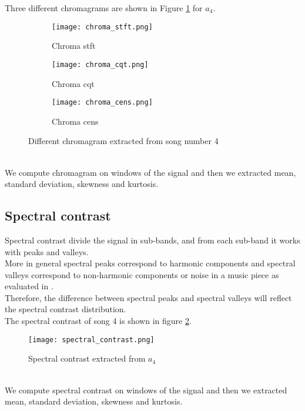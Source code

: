 Three different chromagrams are shown in Figure \ref{fig:chroma} for $a_4$.
\begin{figure}[h]
    \centering
    \begin{subfigure}{{\textwidth}}
    		\texttt{[image: chroma\_stft.png]}
    		\caption{Chroma stft}
    \end{subfigure}
    \begin{subfigure}{\textwidth}
    		\texttt{[image: chroma\_cqt.png]} 
    		\caption{Chroma cqt}
    \end{subfigure}
    \begin{subfigure}{\textwidth}
    		\texttt{[image: chroma\_cens.png]} 
    		\caption{Chroma cens}
    \end{subfigure}
    \caption{Different chromagram extracted from song number 4}
    \label{fig:chroma}
\end{figure}
\\
We compute chromagram on windows of the signal and then we extracted mean, standard deviation, skewness and kurtosis.

\subsection{Spectral contrast}
Spectral contrast divide the signal in sub-bands, and from each sub-band it works with peaks and valleys.
\\
More in general spectral peaks correspond to harmonic components and spectral valleys correspond to non-harmonic components or noise in a music piece as evaluated in \cite{jiang2002music}.
\\
Therefore, the difference between spectral peaks and spectral valleys will reflect the spectral contrast distribution.
\\
The spectral contrast of song 4 is shown in figure \ref{fig:spectral_contrast}.
\begin{figure}[h]
    \centering
    \texttt{[image: spectral\_contrast.png]} 
	\caption{Spectral contrast extracted from $a_4$}
    \label{fig:spectral_contrast}
\end{figure}
\\
We compute spectral contrast on windows of the signal and then we extracted mean, standard deviation, skewness and kurtosis.

